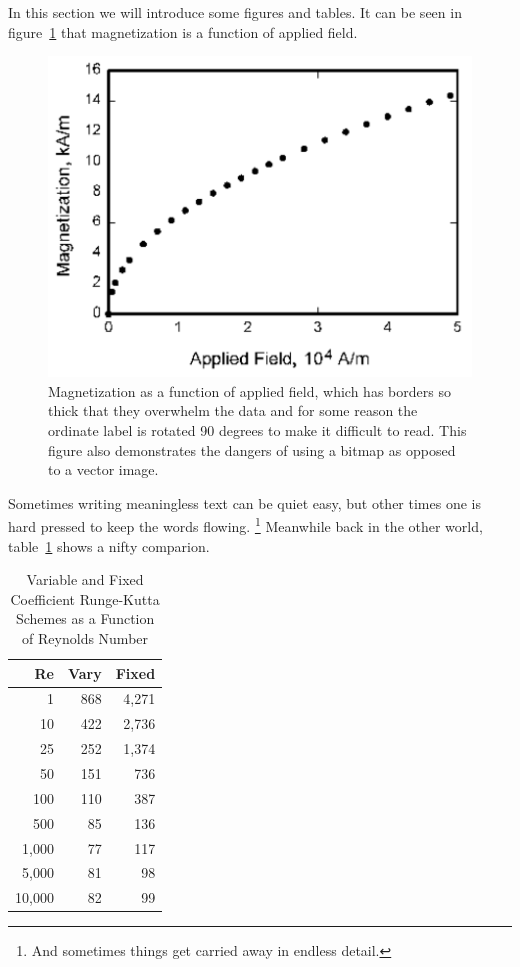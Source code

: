 \documentclass{aiaa-tc}
\begin{document}
In this section we will introduce some figures and tables.
It can be seen in figure~\ref{f:magnetic_field} that magnetization is a
function of applied field.
\begin{figure}
 \centering
 \includegraphics{figure}
 \caption{Magnetization as a function of applied field, which has
   borders so thick that they overwhelm the data and for some reason the
   ordinate label is rotated 90 degrees to make it difficult to
   read. This figure also demonstrates the dangers of using a bitmap
   as opposed to a vector image.}
 \label{f:magnetic_field}
\end{figure}
Sometimes writing meaningless text can be quiet easy, but other times
one is hard pressed to keep the words flowing.%
\footnote{And sometimes things get carried away in endless detail.}
Meanwhile back in the other world, table~\ref{t:scheme_comparison} shows
a nifty comparion.
\begin{table}
  \centering
  \caption{Variable and Fixed Coefficient Runge-Kutta Schemes as a
           Function of Reynolds Number}
  \label{t:scheme_comparison}
  \begin{tabular}{rrr}
       Re & Vary & Fixed \\\hline
        1 &  868 & 4,271 \\
       10 &  422 & 2,736 \\
       25 &  252 & 1,374 \\
       50 &  151 &   736 \\
      100 &  110 &   387 \\
      500 &   85 &   136 \\
    1,000 &   77 &   117 \\
    5,000 &   81 &    98 \\
   10,000 &   82 &    99
  \end{tabular}
\end{table}
\end{document}
